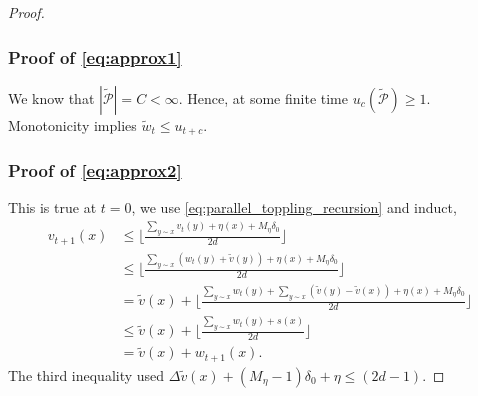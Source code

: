 \documentclass[12pt]{amsart}
\begin{document}
\begin{proof}
	
	\subsubsection*{Proof of \eqref{eq:approx1}}
	We know that $|\tilde{\mathcal{P}}| = C < \infty$. Hence, at some finite time 
	$u_{c}(\tilde{\mathcal{P}}) \geq 1$. Monotonicity implies $\tilde{w}_t \leq u_{t + c}$.
	
	\subsubsection*{Proof of \eqref{eq:approx2}}
	This is true at $t = 0$, we use \eqref{eq:parallel_toppling_recursion} and induct,
	\begin{align*}
	v_{t+1}(x) &\leq \lfloor \frac{\sum_{y \sim x} v_t(y) + \eta(x) + M_{\eta}  \delta_0}{2 d } \rfloor \\
	&\leq \lfloor \frac{\sum_{y \sim x} (w_t(y) + \tilde{v}(y)) + \eta(x) + M_{\eta}  \delta_0}{2 d } \rfloor \\
	&= \tilde{v}(x) + \lfloor \frac{\sum_{y \sim x} w_t(y) +  \sum_{y \sim x} (\tilde{v}(y) - \tilde{v}(x)) + \eta(x) + M_{\eta}  \delta_0}{2 d } \rfloor \\
	&\leq \tilde{v}(x) + \lfloor \frac{\sum_{y \sim x} w_t(y) +  s(x)}{2 d } \rfloor \\
	&= \tilde{v}(x) + w_{t+1}(x).
	\end{align*}
	The third inequality used $\Delta \tilde{v}(x) + (M_{\eta} - 1)  \delta_0 + \eta \leq (2 d -1)$.
	
	
	
	
	
	
	
\end{proof}
\end{document}
